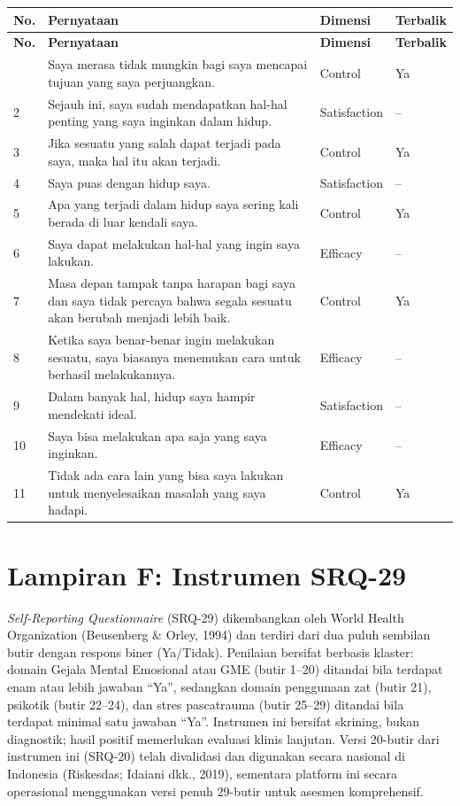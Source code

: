 {\footnotesize
\renewcommand{\arraystretch}{1.3}
\begin{longtable}{|p{0.7cm}|p{7.5cm}|p{2.4cm}|p{1.4cm}|}
\hline
\textbf{No.} & \textbf{Pernyataan} & \textbf{Dimensi} & \textbf{Terbalik} \\
\hline
\endfirsthead
\hline
\textbf{No.} & \textbf{Pernyataan} & \textbf{Dimensi} & \textbf{Terbalik} \\
\hline
\endhead
\hline
\endfoot
1 & Saya merasa tidak mungkin bagi saya mencapai tujuan yang saya perjuangkan. & Control & Ya \\
\hline
2 & Sejauh ini, saya sudah mendapatkan hal-hal penting yang saya inginkan dalam hidup. & Satisfaction & -- \\
\hline
3 & Jika sesuatu yang salah dapat terjadi pada saya, maka hal itu akan terjadi. & Control & Ya \\
\hline
4 & Saya puas dengan hidup saya. & Satisfaction & -- \\
\hline
5 & Apa yang terjadi dalam hidup saya sering kali berada di luar kendali saya. & Control & Ya \\
\hline
6 & Saya dapat melakukan hal-hal yang ingin saya lakukan. & Efficacy & -- \\
\hline
7 & Masa depan tampak tanpa harapan bagi saya dan saya tidak percaya bahwa segala sesuatu akan berubah menjadi lebih baik. & Control & Ya \\
\hline
8 & Ketika saya benar-benar ingin melakukan sesuatu, saya biasanya menemukan cara untuk berhasil melakukannya. & Efficacy & -- \\
\hline
9 & Dalam banyak hal, hidup saya hampir mendekati ideal. & Satisfaction & -- \\
\hline
10 & Saya bisa melakukan apa saja yang saya inginkan. & Efficacy & -- \\
\hline
11 & Tidak ada cara lain yang bisa saya lakukan untuk menyelesaikan masalah yang saya hadapi. & Control & Ya \\
\hline
\end{longtable}
}
\clearpage

\section*{Lampiran F: Instrumen SRQ-29}

\textit{Self-Reporting Questionnaire} (SRQ-29) dikembangkan oleh World Health Organization (Beusenberg \& Orley, 1994) dan terdiri dari dua puluh sembilan butir dengan respons biner (Ya/Tidak). Penilaian bersifat berbasis klaster: domain Gejala Mental Emosional atau GME (butir 1--20) ditandai bila terdapat enam atau lebih jawaban ``Ya'', sedangkan domain penggunaan zat (butir 21), psikotik (butir 22--24), dan stres pascatrauma (butir 25--29) ditandai bila terdapat minimal satu jawaban ``Ya''. Instrumen ini bersifat skrining, bukan diagnostik; hasil positif memerlukan evaluasi klinis lanjutan. Versi 20-butir dari instrumen ini (SRQ-20) telah divalidasi dan digunakan secara nasional di Indonesia (Riskesdas; Idaiani dkk., 2019), sementara platform ini secara operasional menggunakan versi penuh 29-butir untuk asesmen komprehensif.

